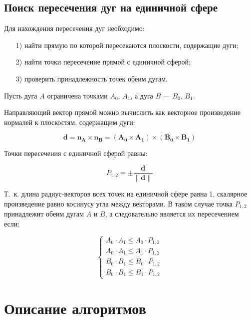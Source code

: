 \subsection{Поиск пересечения дуг на единичной сфере}

Для нахождения пересечения дуг необходимо:
\begin{enumerate}
	\item[1)] найти прямую по которой пересекаются плоскости, содержащие дуги;
	\item[2)] найти точки пересечение прямой с единичной сферой;
	\item[3)] проверить принадлежность точек обеим дугам.
\end{enumerate}

Пусть дуга $A$ ограничена точками $A_0$, $A_1$, а дуга $B$ --- $B_0$, $B_1$.

Направляющий вектор прямой можно вычислить как векторное произведение нормалей к плоскостям, содержащим дуги:

\begin{equation}
	\mathbf{d} = \mathbf{n_A} \times \mathbf{n_B} = (\mathbf{A_0} \times  \mathbf{A_1}) \times (\mathbf{B_0} \times  \mathbf{B_1})
\end{equation}

Точки пересечения с единичной сферой равны:

\begin{equation}
	P_{1,2} = \pm \frac{\mathbf{d}}{\parallel\mathbf{d}\parallel}
\end{equation}

Т.~к. длина радиус-векторов всех точек на единичной сфере равна 1, скалярное произведение равно косинусу угла между векторами. В таком случае точка $P_{1,2}$ принадлежит обеим дугам $A$ и $B$, а следовательно является их пересечением если:

\begin{equation}
	\begin{cases}
		A_0 \cdot A_1 \le A_0 \cdot P_{1,2}\\
		A_0 \cdot A_1 \le A_1 \cdot P_{1,2}\\
		B_0 \cdot B_1 \le B_0 \cdot P_{1,2}\\
		B_0 \cdot B_1 \le B_1 \cdot P_{1,2}
	\end{cases}
\end{equation}

\section{Описание алгоритмов}

